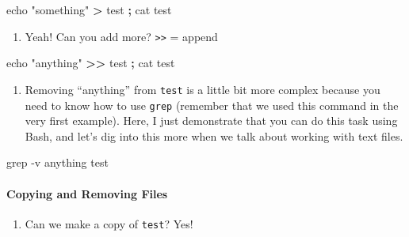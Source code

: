 \documentclass[
]{book}
\newenvironment{Shaded}{\begin{snugshade}}{\end{snugshade}}
\newcommand{\BuiltInTok}[1]{#1}
\newcommand{\FunctionTok}[1]{\textcolor[rgb]{0.00,0.00,0.00}{#1}}
\newcommand{\KeywordTok}[1]{\textcolor[rgb]{0.13,0.29,0.53}{\textbf{#1}}}
\newcommand{\NormalTok}[1]{#1}
\newcommand{\OperatorTok}[1]{\textcolor[rgb]{0.81,0.36,0.00}{\textbf{#1}}}
\newcommand{\StringTok}[1]{\textcolor[rgb]{0.31,0.60,0.02}{#1}}
\providecommand{\tightlist}{%
  \setlength{\itemsep}{0pt}\setlength{\parskip}{0pt}}
\begin{document}
\begin{Shaded}
\begin{Highlighting}[]

\BuiltInTok{echo} \StringTok{"something"} \OperatorTok{\textgreater{}}\NormalTok{ test }\KeywordTok{;} \FunctionTok{cat}\NormalTok{ test }
\end{Highlighting}
\end{Shaded}

\begin{enumerate}
\def\labelenumi{\arabic{enumi}.}
\setcounter{enumi}{5}
\tightlist
\item
  Yeah! Can you add more? \texttt{\textgreater{}\textgreater{}} = append
\end{enumerate}

\begin{Shaded}
\begin{Highlighting}[]

\BuiltInTok{echo} \StringTok{"anything"} \OperatorTok{\textgreater{}\textgreater{}}\NormalTok{ test }\KeywordTok{;} \FunctionTok{cat}\NormalTok{ test }
\end{Highlighting}
\end{Shaded}

\begin{enumerate}
\def\labelenumi{\arabic{enumi}.}
\setcounter{enumi}{6}
\tightlist
\item
  Removing ``anything'' from \texttt{test} is a little bit more complex because you need to know how to use \texttt{grep} (remember that we used this command in the very first example). Here, I just demonstrate that you can do this task using Bash, and let's dig into this more when we talk about working with text files.
\end{enumerate}

\begin{Shaded}
\begin{Highlighting}[]

\FunctionTok{grep}\NormalTok{ {-}v }\StringTok{\textquotesingle{}anything\textquotesingle{}}\NormalTok{ test}
\end{Highlighting}
\end{Shaded}

\hypertarget{copying-and-removing-files}{%
\paragraph{Copying and Removing Files}\label{copying-and-removing-files}}

\begin{enumerate}
\def\labelenumi{\arabic{enumi}.}
\tightlist
\item
  Can we make a copy of \texttt{test}? Yes!
\end{enumerate}
\end{document}
